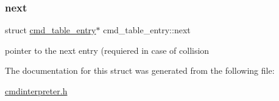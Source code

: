 \subsubsection{\texorpdfstring{next}{next}}
{\footnotesize\ttfamily struct \mbox{\hyperlink{structcmd__table__entry}{cmd\+\_\+table\+\_\+entry}}$\ast$ cmd\+\_\+table\+\_\+entry\+::next}

pointer to the next entry (requiered in case of collision 

The documentation for this struct was generated from the following file\+:\begin{DoxyCompactItemize}
\item 
\mbox{\hyperlink{cmdinterpreter_8h}{cmdinterpreter.\+h}}\end{DoxyCompactItemize}
